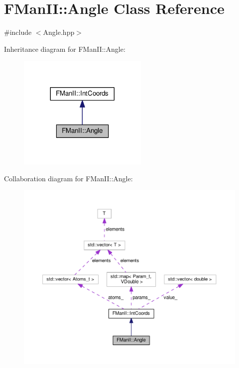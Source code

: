 \hypertarget{classFManII_1_1Angle}{}\section{F\+Man\+II\+:\+:Angle Class Reference}
\label{classFManII_1_1Angle}


{\ttfamily \#include $<$Angle.\+hpp$>$}



Inheritance diagram for F\+Man\+II\+:\+:Angle\+:\nopagebreak
\begin{figure}[H]
\begin{center}
\leavevmode
\includegraphics[width=176pt]{classFManII_1_1Angle__inherit__graph}
\end{center}
\end{figure}


Collaboration diagram for F\+Man\+II\+:\+:Angle\+:\nopagebreak
\begin{figure}[H]
\begin{center}
\leavevmode
\includegraphics[width=350pt]{classFManII_1_1Angle__coll__graph}
\end{center}
\end{figure}
